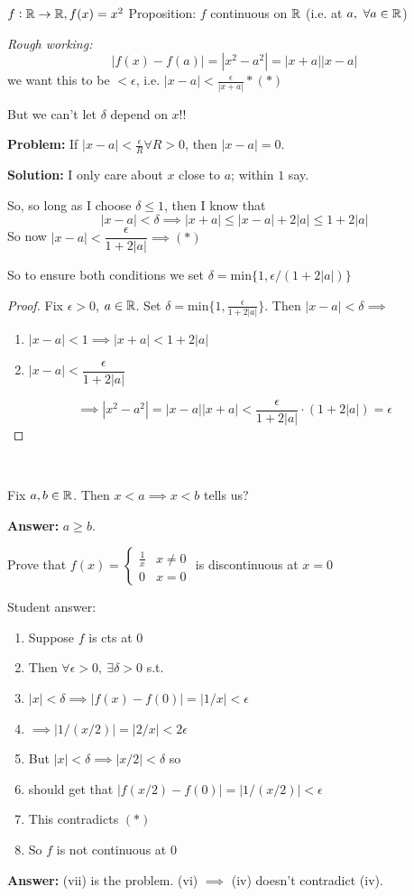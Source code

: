\begin{example}
$f: \mathbb{R}\to \mathbb{R}, f(x) = x^2$
Proposition: $f$ continuous on $\mathbb{R}$ (i.e. at $a,~\forall a \in\mathbb{R}$)

\emph{Rough working:} 
\[|f(x) - f(a)| = |x^2-a^2| = |x+a||x-a|\]
we want this to be $< \epsilon$, i.e. $|x-a| < \frac{\epsilon}{|x+a|} *(*)$

But we can't let $\delta$ depend on $x$!!

\textbf{Problem:} If $|x-a| < \frac{\epsilon}{R} \forall R>0$, then $|x-a| =0$.

\textbf{Solution:} I only care about $x$ close to $a$; within $1$ say.


So, so long as I choose $\delta \leq 1$, then I know that 
\[|x-a| < \delta \implies |x+a| \leq |x-a| + 2|a| \leq 1 + 2|a|\]
So now $|x-a| < \dfrac{\epsilon}{1 + 2|a|} \implies (*)$

So to ensure both conditions we set $\delta = \mathrm{min}\{1,\epsilon/(1+2|a|)\}$

\begin{proof}
Fix $\epsilon >0$, $a \in\mathbb{R}$. Set $\delta = \mathrm{min}\{1,\frac{\epsilon}{1 + 2|a|}\}$. Then $|x-a| < \delta \implies$
\begin{enumerate}
\item $|x-a| < 1 \implies |x+a| < 1 + 2|a|$
\item $|x-a| < \dfrac{\epsilon}{1 + 2|a|}$
\end{enumerate}

\[\implies |x^2 -a^2| = |x-a||x+a| < \dfrac{\epsilon}{1+2|a|}\cdot(1+2|a|) = \epsilon\]
\end{proof}
\end{example}~

\begin{clicker}
Fix $a,b \in\mathbb{R}$. Then $x < a \implies x < b$ tells us? 

\textbf{Answer:} $a \geq b$. 

Prove that $f(x) = \begin{cases}
 	\frac{1}{x} & x \neq 0\\
 	0 & x = 0
 \end{cases}$
 is discontinuous at $x = 0$

Student answer:
\begin{enumerate}
\item Suppose $f$ is cts at $0$
\item Then $\forall \epsilon >0,~\exists \delta > 0$ s.t.
\item $|x| < \delta \implies |f(x) - f(0)| = |1/x| < \epsilon$
\item $\implies |1/(x/2)| = |2/x| < 2\epsilon$
\item But $|x| < \delta \implies |x/2| < \delta$ so
\item should get that $|f(x/2) - f(0)| = |1/(x/2)| < \epsilon$
\item This contradicts $(*)$	
\item So $f$ is not continuous at $0$
\end{enumerate}

\textbf{Answer:} (vii) is the problem. (vi) $\implies$ (iv) doesn't contradict (iv).
\end{clicker}


